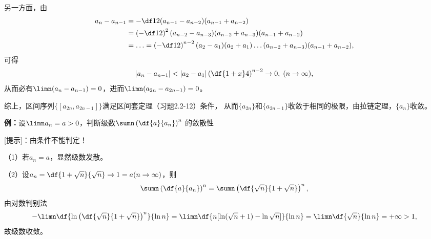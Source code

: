 另一方面，由
\begin{align}
	a_n-a_{n-1}&=-\df12(a_{n-1}-a_{n-2})(a_{n-1}+a_{n-2})\notag\\
	&=\left(-\df12\right)^2(a_{n-2}-a_{n-3})(a_{n-2}+a_{n-3})(a_{n-1}+a_{n-2})\notag\\
	&=\ldots=\left(-\df12\right)^{n-2}(a_2-a_1)(a_2+a_1)\ldots
	(a_{n-2}+a_{n-3})(a_{n-1}+a_{n-2}),\notag
\end{align}
可得
$$|a_n-a_{n-1}|<|a_2-a_1|\left(\df{1+x}4\right)^{n-2}\to0,
\;(n\to\infty),$$
从而必有$\limn(a_n-a_{n-1})=0$，进而$\limn(a_{2n}-a_{2n-1})=0$。

综上，区间序列$\{[a_{2n},a_{2n-1}]\}$满足区间套定理（习题2.2-12）条件，
从而$\{a_{2n}\}$和$\{a_{2n-1}\}$收敛于相同的极限，由拉链定理，$\{a_n\}$收敛。

\bigskip

{\bf 例：}设$\limn a_n=a>0$，判断级数$\sumn\left(\df{a}{a_n}\right)^n$
的敛散性

[提示]：由条件不能判定！

（1）若$a_n=a$，显然级数发散。

（2）设$a_n=\df{1+\sqrt n}{\sqrt n}\to1=a(n\to\infty)$，则
$$\sumn\left(\df{a}{a_n}\right)^n=\sumn\left(\df{\sqrt n}
{1+\sqrt n}\right)^n,$$
由对数判别法
$$-\limn\df{\ln \left(\df{\sqrt n}{1+\sqrt n}\right)^n}
{\ln n}=\limn\df{n[\ln(\sqrt n+1)-\ln\sqrt n]}{\ln n}
=\limn\df{\sqrt n}{\ln n}=+\infty>1,$$
故级数收敛。
